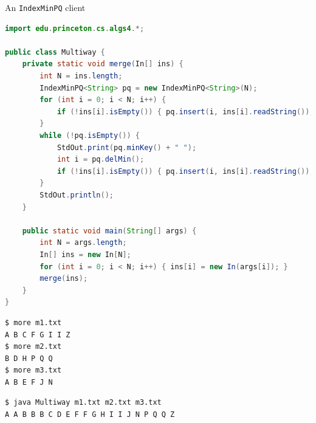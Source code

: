 \documentclass[8pt,a4paper,compress]{beamer}
\begin{document}
\begin{frame}[fragile]
\pause

An \lstinline{IndexMinPQ} client
\begin{lstlisting}[language=Java]
import edu.princeton.cs.algs4.*;

public class Multiway { 
    private static void merge(In[] ins) { 
        int N = ins.length; 
        IndexMinPQ<String> pq = new IndexMinPQ<String>(N); 
        for (int i = 0; i < N; i++) { 
            if (!ins[i].isEmpty()) { pq.insert(i, ins[i].readString()); }
        } 
        while (!pq.isEmpty()) {
            StdOut.print(pq.minKey() + " "); 
            int i = pq.delMin(); 
            if (!ins[i].isEmpty()) { pq.insert(i, ins[i].readString()); }
        }
        StdOut.println();
    } 

    public static void main(String[] args) { 
        int N = args.length; 
        In[] ins = new In[N]; 
        for (int i = 0; i < N; i++) { ins[i] = new In(args[i]); } 
        merge(ins); 
    } 
} 
\end{lstlisting}

\pause

\begin{lstlisting}[language={}]
$ more m1.txt 
A B C F G I I Z
$ more m2.txt 
B D H P Q Q
$ more m3.txt 
A B E F J N
\end{lstlisting}

\pause

\begin{lstlisting}[language={}]
$ java Multiway m1.txt m2.txt m3.txt 
A A B B B C D E F F G H I I J N P Q Q Z 
\end{lstlisting}
\end{frame}
\end{document}
